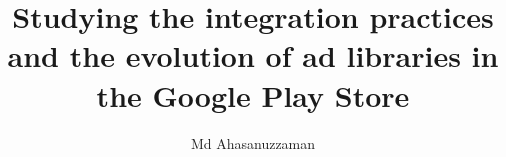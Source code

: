

   


\usepackage{natbib}

\usepackage{caption}
\usepackage{lipsum}
\usepackage{fancyhdr}
\usepackage{longtable}
\usepackage[flushleft]{threeparttable}
\usepackage{tabu}
\fancyfoot{}
\fancyhead[RO,LE]{\thepage}
\fancyhead[LO]{\leftmark}
\fancyhead[RE]{\rightmark}
\usepackage[toc,page]{appendix}
\newcommand{\smalltt}[1]{\ifmmode{\mbox{\smaller\texttt{#1}}}\else{\smaller\tt #1}\fi}
\newcommand{\code}[1]{\smalltt{#1}}





\title{Studying the integration practices and the evolution of ad libraries in the Google Play Store}

\author{Md Ahasanuzzaman}


\beforepreface
\singlespacing  \doublespacing



\setlength{\abovedisplayskip}{3pt plus1pt minus1pt}
\setlength{\abovedisplayshortskip}{3pt plus1pt minus1pt}
\setlength{\belowdisplayskip}{3pt plus1pt minus1pt}
\setlength{\belowdisplayshortskip}{3pt plus1pt minus1pt}


 

%
 

\addtables
\pagestyle{fancy}




%






%



% 

